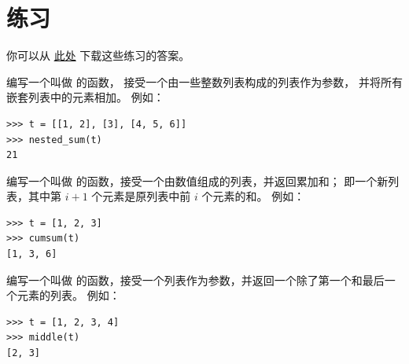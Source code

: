 \section{练习}


你可以从 \href{http://thinkpython2.com/code/list_exercises.py}{此处} 下载这些练习的答案。

\begin{exercise}


编写一个叫做  的函数， 接受一个由一些整数列表构成的列表作为参数， 并将所有嵌套列表中的元素相加。 例如：

\begin{lstlisting}
>>> t = [[1, 2], [3], [4, 5, 6]]
>>> nested_sum(t)
21
\end{lstlisting}

\end{exercise}

\begin{exercise}
\label{cumulative}


编写一个叫做  的函数，接受一个由数值组成的列表，并返回累加和；
即一个新列表，其中第 $i+1$ 个元素是原列表中前 $i$ 个元素的和。
例如：

\begin{lstlisting}
>>> t = [1, 2, 3]
>>> cumsum(t)
[1, 3, 6]
\end{lstlisting}

\end{exercise}

\begin{exercise}


编写一个叫做  的函数，接受一个列表作为参数，并返回一个除了第一个和最后一个元素的列表。
例如：


\begin{lstlisting}
>>> t = [1, 2, 3, 4]
>>> middle(t)
[2, 3]
\end{lstlisting}

\end{exercise}

